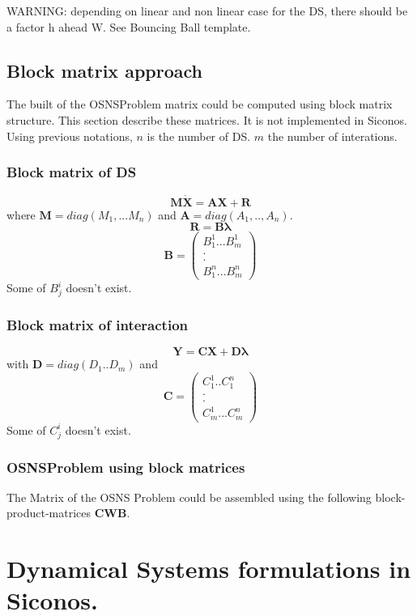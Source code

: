 \documentclass[10pt]{report}
\begin{document}
WARNING: depending on linear and non linear case for the DS, there should be a factor h ahead W. See Bouncing Ball template. 
\section{Block matrix approach}
The built of the OSNSProblem matrix could be computed using block
matrix structure. This section describe these matrices. It is not
implemented in Siconos.
Using previous notations, $n$ is the number of DS. $m$ the number of
interations.

\subsection{Block matrix of DS}
\[\boldsymbol{M}  \boldsymbol{\dot X}=\boldsymbol{A} \boldsymbol{X} + \boldsymbol{R}\]
where $\boldsymbol{M}=diag(M_1,...M_n)$ and
$\boldsymbol{A}=diag(A_1,..,A_n)$.
\[\boldsymbol{R}=\boldsymbol{B}\boldsymbol{\lambda}\]
\[\boldsymbol{B}=\left( \begin{array} {c} B^1_{1}...B^1_m\\.\\.\\
    B^n_1...B^n_m  \end{array}\right)\]
Some of $B^i_j$ doesn't exist.
\subsection{Block matrix of interaction}
\[ \boldsymbol{Y}= \boldsymbol{C}  \boldsymbol{X}+
\boldsymbol{D} \boldsymbol{\lambda}\]
with $ \boldsymbol{D}=diag(D_1..D_m)$ and 
\[ \boldsymbol{C}=\left( \begin{array} {c}
    C^1_{1}..C^n_1\\.\\.\\C^1_{m}...C^n_{m} \end{array}\right)\]
Some of $C^i_j$ doesn't exist.

\subsection{OSNSProblem using block matrices}
The Matrix of the OSNS Problem could be assembled using the following
block-product-matrices $\boldsymbol{C}\boldsymbol{W}\boldsymbol{B}$.
\chapter{Dynamical Systems formulations in Siconos.}
\end{document}
